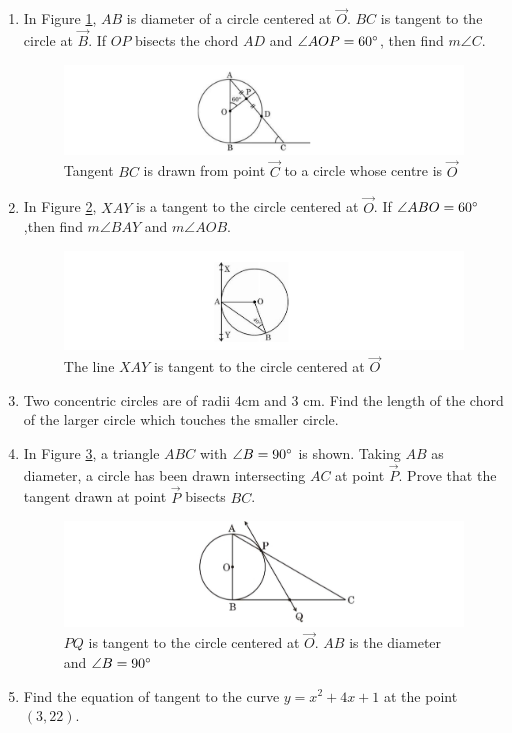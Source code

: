 \begin{enumerate}
	\item In Figure \ref{fig:ver1}, $AB$ is diameter of a circle centered at $\vec{O}$. $BC$ is tangent to the circle at $\vec{B}$. If $OP$ bisects the chord $AD$ and $\angle AOP=60\degree$, then find $m\angle C$.
		\begin{figure}[H]
			\centering
			\includegraphics[width=\columnwidth]{figs/ver}
			\caption{Tangent $BC$ is drawn from point $\vec{C}$ to a circle whose centre is $\vec{O}$}
			\label{fig:ver1}
		\end{figure}

	\item In Figure \ref{fig:hor1}, $XAY$ is a tangent to the circle centered at $\vec{O}$. If $\angle ABO=60\degree$,then find $m\angle BAY$ and $m\angle AOB$.
		\begin{figure}
			\centering
			\includegraphics[width=\columnwidth]{figs/hor}
			\caption{The line $XAY$ is tangent to the circle centered at $\vec{O}$}
			\label{fig:hor1}
		\end{figure}

	\item Two concentric circles are of radii 4cm and 3 cm. Find the length of the chord of the larger circle which touches the smaller circle.

	\item In Figure \ref{fig:sl1}, a triangle $ABC$ with $\angle B=90\degree$ is shown. Taking $AB$ as diameter, a circle has been drawn intersecting $AC$ at point $\vec{P}$. Prove that the tangent drawn at point $\vec{P}$ bisects $BC$.
		\begin{figure}[H]
			\centering
			\includegraphics[width=\columnwidth]{figs/sl}
			\caption{$PQ$ is tangent to the circle centered at $\vec{O}$. $AB$ is the diameter and $\angle B=90\degree$}
			\label{fig:sl1}
		\end{figure}
\item Find the equation of tangent to the curve $y = x^2 + 4x + 1$ at the point $(3,22)$.
\end{enumerate}
